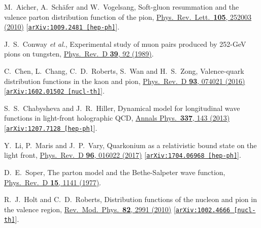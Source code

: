 \documentclass[aps,prl,reprint,groupedaddress, preprintnumbers]{revtex4-1}
\begin{document}
\begin{thebibliography}{50}
  M.~Aicher, A.~Sch\"afer and W.~Vogelsang,
  Soft-gluon resummation and the valence parton distribution function of the pion,
  \href{https://doi.org/10.1103/PhysRevLett.105.252003}{Phys.\ Rev.\ Lett.\  {\bf 105}, 252003 (2010)}
  [\href{https://arxiv.org/abs/1009.2481}{\tt arXiv:1009.2481 [hep-ph]}].


  J.~S.~Conway {\it et al.},
  Experimental study of muon pairs produced by 252-GeV pions on tungsten,
  \href{https://doi.org/10.1103/PhysRevD.39.92}{Phys.\ Rev.\ D {\bf 39}, 92 (1989)}.
  
 
  C.~Chen, L.~Chang, C.~D.~Roberts, S.~Wan and H.~S.~Zong,
  Valence-quark distribution functions in the kaon and pion,
  \href{https://doi.org/10.1103/PhysRevD.93.074021}{Phys.\ Rev.\ D {\bf 93},  074021 (2016)}
  [\href{https://arxiv.org/abs/1602.01502}{\tt arXiv:1602.01502 [nucl-th]}].  
  
  
  S.~S.~Chabysheva and J.~R.~Hiller,
  Dynamical model for longitudinal wave functions in light-front holographic QCD,
  \href{https://www.sciencedirect.com/science/article/pii/S0003491613001486?via%3Dihub}{Annals Phys.\  {\bf 337}, 143 (2013)}
  [\href{https://arxiv.org/abs/1207.7128}{\tt arXiv:1207.7128 [hep-ph]}].
  
  
  Y.~Li, P.~Maris and J.~P.~Vary,
  Quarkonium as a relativistic bound state on the light front,
  \href{https://journals.aps.org/prd/abstract/10.1103/PhysRevD.96.016022}{Phys.\ Rev.\ D {\bf 96}, 016022 (2017)}
  [\href{https://arxiv.org/abs/1704.06968}{\tt arXiv:1704.06968 [hep-ph]}].
  
  
  D.~E.~Soper,
  The parton model and the Bethe-Salpeter wave function,
  \href{https://doi.org/10.1103/PhysRevD.15.1141}{ Phys.\ Rev.\ D {\bf 15}, 1141 (1977)}.  
 
   
  R.~J.~Holt and C.~D.~Roberts,
  Distribution functions of the nucleon and pion in the valence region,
  \href{https://doi.org/10.1103/RevModPhys.82.2991}{Rev.\ Mod.\ Phys.\  {\bf 82}, 2991 (2010)}
  [\href{https://arxiv.org/abs/1002.4666}{\tt arXiv:1002.4666 [nucl-th]}].
  



\end{thebibliography}
\end{document}
